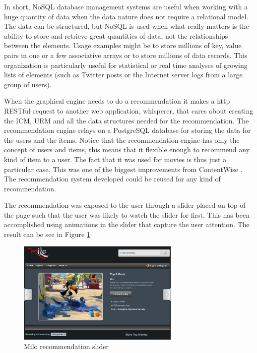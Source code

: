 In short, NoSQL database management systems are useful when working with a huge quantity of data when the data nature does not require a relational model. The data can be structured, but NoSQL is used when what really matters is the ability to store and retrieve great quantities of data, not the relationships between the elements. Usage examples might be to store millions of key, value pairs in one or a few associative arrays or to store millions of data records. This organization is particularly useful for statistical or real time analyses of growing lists of elements (such as Twitter posts or the Internet server logs from a large group of users).

When the graphical engine needs to do a recommendation it makes a \ac{http} \ac{RESTful} request to another web application, whisperer, that cares about creating the \ac{ICM}, \ac{URM} and all the data structures needed for the recommendation. The recommendation engine relays on a PostgreSQL \cite{postgresql} database for storing the data for the users and the items. Notice that the recommendation engine has only the concept of users and items, this means that it flexible enough to recommend any kind of item to a user. The fact that it was used for movies is thus just a particular case. This was one of the biggest improvements from ContentWise \cite{ContentWise}. The recommendation system developed could be reused for any kind of recommendation.

The recommendation was exposed to the user through a slider placed on top of the page such that the user was likely to watch the slider for first. This has been accomplished using animations in the slider that capture the user attention. The result can be see in Figure \ref{fig:milo_slider} 

\begin{figure}
  \centering
  \includegraphics[width=0.7\textwidth]{figures/milo_slider.png}
  \caption{Milo recommendation slider}
  \label{fig:milo_slider}
\end{figure}

